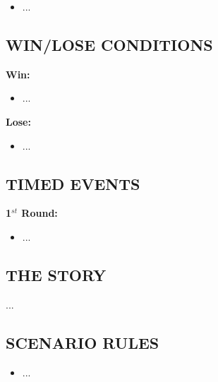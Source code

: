 \begin{multicols*}{2}
\begin{itemize}
    \item ...
\end{itemize}

\subsection*{\MakeUppercase{Win/lose conditions}}

\textbf{Win:}
\begin{itemize}
    \item ...
\end{itemize}

\textbf{Lose:}
\begin{itemize}
    \item ...
\end{itemize}

\subsection*{\MakeUppercase{Timed events}}

\textbf{1$^{st}$ Round:}
\begin{itemize}
    \item ...
\end{itemize}

\subsection*{\MakeUppercase{The story}}

... 

\end{multicols*}

\newpage

\subsection*{\MakeUppercase{Scenario rules}}

\begin{itemize}
    \item ...
\end{itemize}



